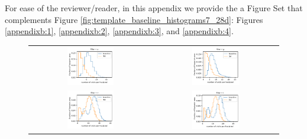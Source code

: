 \documentclass[preprintm,linenumbers]{aastex631}
\begin{document}
		For ease of the reviewer/reader, in this appendix we provide the a Figure Set that complements Figure \ref{fig:template_baseline_histograms7_28d}: Figures \ref{appendixb:1}, \ref{appendixb:2}, \ref{appendixb:3}, and \ref{appendixb:4}. 


  \begin{figure}
			\centering
			\begin{tabular}{c c}
				\includegraphics[width=0.4\textwidth]{results/histograms/hist_first_year_one_snap_v4_0_10yrs_db_noDD_noTwi_CountMetric_doAllTemplateMetrics_reduceCount_u_3_noDD_noTwi.pdf} &
				 \includegraphics[width=0.4\textwidth]{results/histograms/hist_first_year_one_snap_v4_0_10yrs_db_noDD_noTwi_CountMetric_doAllTemplateMetrics_reduceCount_g_3_noDD_noTwi.pdf} \\
				 \includegraphics[width=0.4\textwidth]{results/histograms/hist_first_year_one_snap_v4_0_10yrs_db_noDD_noTwi_CountMetric_doAllTemplateMetrics_reduceCount_r_3_noDD_noTwi.pdf} &
				\includegraphics[width=0.4\textwidth]{results/histograms/hist_first_year_one_snap_v4_0_10yrs_db_noDD_noTwi_CountMetric_doAllTemplateMetrics_reduceCount_i_3_noDD_noTwi.pdf} \\

\end{tabular}
\end{figure}
\end{document}
